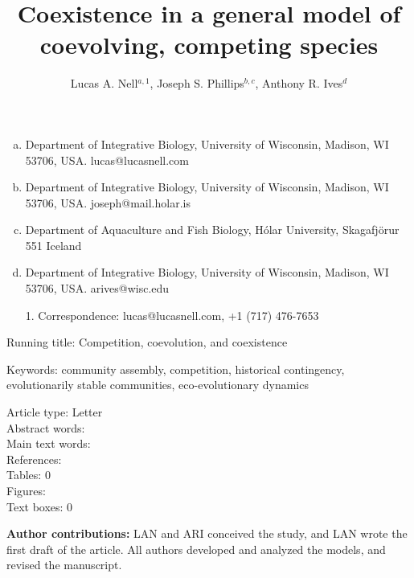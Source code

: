\documentclass[12pt]{article}
\title{Coexistence in a general model of coevolving, competing species}
\author{Lucas A. Nell$^{a,1}$,
Joseph S. Phillips$^{b,c}$,
Anthony R. Ives$^{d}$}
\date{}
\begin{document}
\singlespacing
\linenumbers{}
\modulolinenumbers[1]

\maketitle
\author{}

\raggedright
\setlength{\parskip}{1em}


\begin{enumerate}[a.]
\item
Department of Integrative Biology, University of Wisconsin, Madison, WI 53706, USA. lucas@lucasnell.com
\item
Department of Integrative Biology, University of Wisconsin, Madison, WI 53706, USA. joseph@mail.holar.is
\item
Department of Aquaculture and Fish Biology, H\'{o}lar University, Skagafj\"{o}r{\dh}ur 551 Iceland
\item 
Department of Integrative Biology, University of Wisconsin, Madison, WI 53706, USA. arives@wisc.edu \\[1ex]
\item[1.]
Correspondence: lucas@lucasnell.com, +1 (717) 476-7653
\end{enumerate}




\noindent Running title: Competition, coevolution, and coexistence

\noindent Keywords: {
community assembly,
competition,
historical contingency,
evolutionarily stable communities,
eco-evolutionary dynamics}

\bigskip

\noindent Article type: Letter \\
\noindent Abstract words:  \\
\noindent Main text words:  \\ %
\noindent References: \\
\noindent Tables: 0 \\
\noindent Figures:  \\
\noindent Text boxes: 0 \\


\bigskip


\textbf{Author contributions:} LAN and ARI conceived the study,
and LAN wrote the first draft of the article.
All authors developed and analyzed the models, and revised the manuscript.
\end{document}
